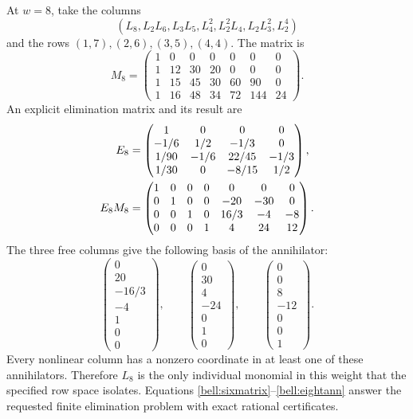 At $w=8$, take the columns
\[
 (L_8,L_2L_6,L_3L_5,L_4^2,L_2^2L_4,L_2L_3^2,L_2^4)
\]
and the rows $(1,7),(2,6),(3,5),(4,4)$. The matrix is
\begin{equation}
 M_8=\begin{pmatrix}
 1&0&0&0&0&0&0\\
 1&12&30&20&0&0&0\\
 1&15&45&30&60&90&0\\
 1&16&48&34&72&144&24
 \end{pmatrix}.
 \label{bell:eightmatrix}
\end{equation}
An explicit elimination matrix and its result are
\begin{align}
 E_8&=\begin{pmatrix}
 1&0&0&0\\-1/6&1/2&-1/3&0\\
 1/90&-1/6&22/45&-1/3\\1/30&0&-8/15&1/2
 \end{pmatrix},\notag\\
 E_8M_8&=\begin{pmatrix}
 1&0&0&0&0&0&0\\
 0&1&0&0&-20&-30&0\\
 0&0&1&0&16/3&-4&-8\\
 0&0&0&1&4&24&12
 \end{pmatrix}.
 \label{bell:eightrref}
\end{align}
The three free columns give the following basis of the annihilator:
\begin{equation}
 \begin{pmatrix}0\\20\\-16/3\\-4\\1\\0\\0\end{pmatrix},\qquad
 \begin{pmatrix}0\\30\\4\\-24\\0\\1\\0\end{pmatrix},\qquad
 \begin{pmatrix}0\\0\\8\\-12\\0\\0\\1\end{pmatrix}.
 \label{bell:eightann}
\end{equation}
Every nonlinear column has a nonzero coordinate in at least one of
these annihilators. Therefore $L_8$ is the only individual monomial
in this weight that the specified row space isolates. Equations
\eqref{bell:sixmatrix}--\eqref{bell:eightann} answer the requested finite
elimination problem with exact rational certificates.


